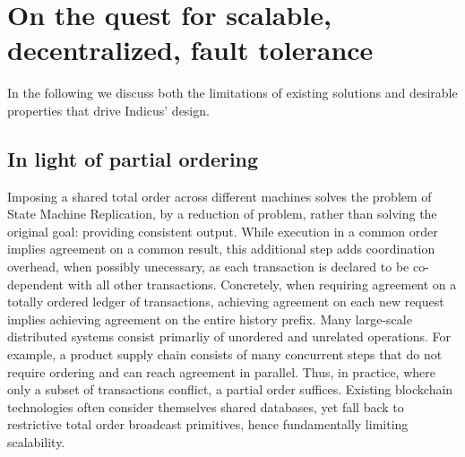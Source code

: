 \section{On the quest for scalable, decentralized, fault tolerance}
In the following we discuss both the limitations of existing solutions and desirable properties that drive Indicus' design. 

\subsection{In light of partial ordering}
Imposing a shared total order across different machines solves the problem of State Machine Replication, by a reduction of problem, rather than solving the original goal: providing consistent output. While execution in a common order implies agreement on a common result, this additional step adds coordination overhead, when possibly unecessary, as each transaction is declared to be co-dependent with all other transactions. 
Concretely, when requiring agreement on a totally ordered ledger of transactions, achieving agreement on each new request implies achieving agreement on the entire history prefix. Many large-scale distributed systems consist primarliy of unordered and unrelated operations. For example, a product supply chain consists of many concurrent steps that do not require ordering and can reach agreement in parallel.  Thus, in practice, where only a subset of transactions conflict, a partial order suffices. 
Existing blockchain technologies  often consider themselves shared databases, yet fall back to restrictive total order broadcast primitives, hence fundamentally limiting scalability. 


